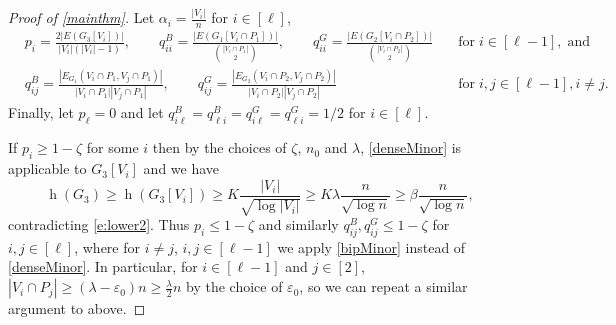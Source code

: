 \documentclass{article}
\newcommand{\eps}{\varepsilon}
\DeclareMathOperator{\had}{h}
\begin{document}
\begin{proof}[Proof of \cref{mainthm}]
Let $\alpha_i = \frac{|V_i|}{n}$ for $i \in [\ell]$, \begin{align*}&p_i = \frac{2|E(G_3[V_i])|}{|V_i|(|V_i|-1)}, \qquad q^{B}_{ii} = \frac{|E(G_1[V_i \cap P_1])|}{\binom{|V_i \cap P_1|}2}, \qquad q^{G}_{ii} = \frac{|E(G_2[V_i \cap P_2])|}{{\binom{|V_i \cap P_2|}2}} &\quad \mathrm{for} \; i \in [\ell-1], \; \mathrm{and} \\
 &q^{B}_{ij} = \frac{|E_{G_1}(V_i \cap P_1,V_j \cap P_1)|}{|V_i \cap P_1||V_j \cap P_1|}, \qquad  q^{G}_{ij} = \frac{|E_{G_2}(V_i \cap P_2,V_j \cap P_2)|}{|V_i \cap P_2||V_j \cap P_2|} &\quad \mathrm{for}\;    i,j \in [\ell-1], i \neq j.\end{align*}
Finally,  let $p_{\ell}=0$ and let $q^{B}_{i\ell} = q^{B}_{\ell i} = q^{G}_{i\ell} = q^{G}_{\ell i} = 1/2$ for $i \in [\ell]$. 

If $p_{i} \geq 1-\zeta$ for some $i$ then  by the choices of $\zeta$, $n_0$ and $\lambda$, \cref{denseMinor} is applicable to $G_3[V_i]$ and we have $$\had(G_3) \geq \had(G_3[V_i]) \geq K\frac{|V_i|}{\sqrt{\log |V_i|}} \geq K\lambda \frac{n}{\sqrt{\log n}} \geq \beta  \frac{n}{\sqrt{\log n}},$$
contradicting \eqref{e:lower2}. Thus $p_{i} \leq 1-\zeta$ and similarly $q^{B}_{ij},q^{G}_{ij} \leq 1-\zeta$ for $i,j \in [\ell]$, where for $i \neq j$, $i,j \in [\ell-1]$ we apply \cref{bipMinor} instead of \cref{denseMinor}. In particular, for $i \in [\ell-1]$ and $j \in [2]$, $|V_i \cap P_j| \geq (\lambda - \eps_0)n \geq \frac\lambda2 n$ by the choice of $\eps_0$, so we can repeat a similar argument to above.


\end{proof}
\end{document}
